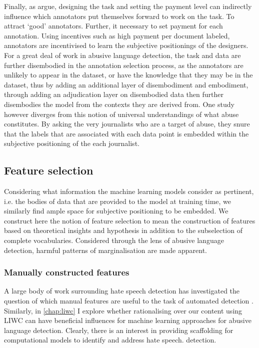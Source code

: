 Finally, as \citet{Sabou:2014} argue, designing the task and setting the payment level can indirectly influence which annotators put themselves forward to work on the task. To attract `good' annotators. Further, it necessary to set payment for each annotation. Using incentives such as high payment per document labeled, annotators are incentivised to learn the subjective positionings of the designers. For a great deal of work in abusive language detection, the task and data are further disembodied in the annotation selection process, as the annotators are unlikely to appear in the dataset, or have the knowledge that they may be in the dataset, thus by adding an additional layer of disembodiment and embodiment, through adding an adjudication layer on disembodied data then further disembodies the model from the contexts they are derived from. One study however diverges from this notion of universal understandings of what abuse constitutes. By asking the very journalists who are a target of abuse, they snure that the labels that are associated with each data point is embedded within the subjective positioning of the each journalist.


\subsection{Feature selection}

Considering what information the machine learning models consider as pertinent, i.e. the bodies of data that are provided to the model at training time, we similarly find ample space for subjective positioning to be embedded. We construct here the notion of feature selection to mean the construction of features based on theoretical insights and hypothesis in addition to the subselection of complete vocabularies. Considered through the lens of abusive language detection, harmful patterns of marginalisation are made apparent.\vspace{5mm}

\subsubsection{Manually constructed features}

A large body of work surrounding hate speech detection has investigated the question of which manual features are useful to the task of automated detection \citep{Waseem:2016,Chiril:2019,Fortuna:2018,Stankovic:2020}. Similarly, in \autoref{chap:liwc} I explore whether rationalising over our content using LIWC can have beneficial influences for machine learning approaches for abusive language detection. Clearly, there is an interest in providing scaffolding for computational models to identify and address hate speech. detection.

